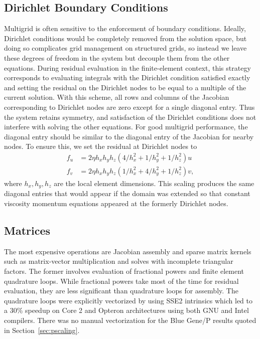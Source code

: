 \subsection{Dirichlet Boundary Conditions}\label{ssec:dirichlet}
Multigrid is often sensitive to the enforcement of boundary conditions.  Ideally, Dirichlet
conditions would be completely removed from the solution space, but doing so complicates grid
management on structured grids, so instead we leave these degrees of freedom in the system but
decouple them from the other equations.  During residual evaluation in the finite-element context,
this strategy corresponds to evaluating integrals with the Dirichlet condition satisfied exactly and setting
the residual on the Dirichlet nodes to be equal to a multiple of the current solution.  With this
scheme, all rows and columns of the Jacobian corresponding to Dirichlet nodes are zero except for a
single diagonal entry. Thus the system retains symmetry, and satisfaction of the Dirichlet conditions
does not interfere with solving the other equations.  For good multigrid performance, the diagonal
entry should be similar to the diagonal entry of the Jacobian for nearby nodes.  To ensure this, we
set the residual at Dirichlet nodes to
\begin{equation}\label{eq:dirichlet-scale}
  \begin{split}
    f_u &= 2 \eta h_xh_yh_z (4/h_x^2 + 1/h_y^2 + 1/h_z^2) u \\
    f_v &= 2 \eta h_xh_yh_z (1/h_x^2 + 4/h_y^2 + 1/h_z^2) v,
  \end{split}
\end{equation}
where $h_x,h_y,h_z$ are the local element dimensions.  This scaling produces the same diagonal
entries that would appear if the domain was extended so that constant viscosity momentum equations
appeared at the formerly Dirichlet nodes.

\subsection{Matrices}
The most expensive operations are Jacobian assembly and sparse matrix kernels such as matrix-vector multiplication and solves with incomplete triangular factors.
The former involves evaluation of fractional powers and finite element quadrature loops.  While fractional powers take most of the time for residual evaluation, they are less significant than quadrature loops for assembly.  The quadrature loops were explicitly vectorized by using SSE2 intrinsics which led to a 30\% speedup on Core 2 and Opteron architectures using both GNU and Intel compilers.  There was no manual vectorization for the Blue Gene/P results quoted in Section~\ref{sec:pscaling}.


